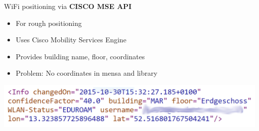 \documentclass[11pt]{beamer}
\begin{document}
\begin{frame}{WiFi positioning via \textbf{CISCO MSE API}}
    
     {
	    
	    \begin{itemize}
	    
	        \item For rough positioning
	        \item Uses Cisco Mobility Services Engine
	        \item Provides building name, floor, coordinates
    	    \item Problem: No coordinates in mensa and library
    
	    \end{itemize}
	}
    
     {
    
    	\begin{center}
	    
	        \includegraphics[width=\textwidth]{tubitapi_response}
		   
	    \end{center}
	
	}
    
\end{frame}
\end{document}
